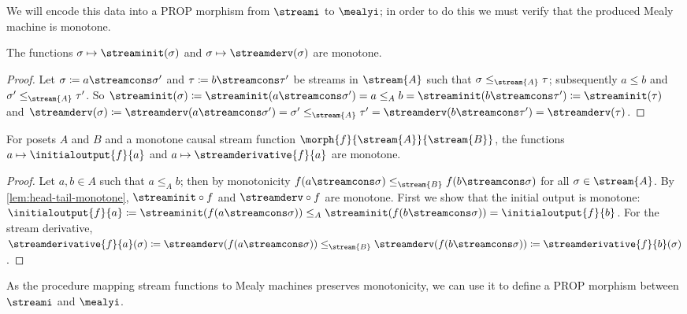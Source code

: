 \documentclass{lmcs}
\begin{document}
We will encode this data into a PROP morphism from \(\streami\) to \(\mealyi\);
in order to do this we must verify that the produced Mealy machine is monotone.

\begin{lem}\label{lem:head-tail-monotone}
    The functions \(\sigma \mapsto \streaminit(\sigma)\) and
    \(\sigma \mapsto \streamderv(\sigma)\) are monotone.
\end{lem}
\begin{proof}
    Let \(\sigma \coloneqq a \streamcons \sigma^\prime\) and
    \(\tau \coloneqq b \streamcons \tau^\prime\) be streams in \(\stream{A}\)
    such that \(\sigma \leq_{\stream{A}} \tau\); subsequently \(a \leq b\) and
    \(\sigma^\prime \leq_{\stream{A}} \tau^\prime\).
    So \(
    \streaminit(\sigma) \coloneqq
    \streaminit(a \streamcons \sigma^\prime) =
    a \leq_{A}
    b =
    \streaminit(b \streamcons \tau^\prime) \coloneqq
    \streaminit(\tau)
    \) and \(
    \streamderv(\sigma) \coloneqq
    \streamderv(a \streamcons \sigma^\prime) =
    \sigma^\prime \leq_{\stream{A}}
    \tau^\prime =
    \streamderv(b \streamcons \tau^\prime) =
    \streamderv(\tau)
    \).
\end{proof}

\begin{lem}\label{lem:initial-derivative-monotone}
    For posets \(A\) and \(B\) and a monotone causal stream function
    \(\morph{f}{\stream{A}}{\stream{B}}\), the functions
    \(a \mapsto \initialoutput{f}{a}\) and \(a \mapsto \streamderivative{f}{a}\)
    are monotone.
\end{lem}
\begin{proof}
    Let \(a, b \in A\) such that \(a \leq_A b\); then by monotonicity
    \(f(a \streamcons \sigma) \leq_{\stream{B}} f(b \streamcons \sigma)\) for
    all \(\sigma \in \stream{A}\).
    By \autoref{lem:head-tail-monotone}, \(\streaminit \circ f\) and
    \(\streamderv \circ f\) are monotone.
    First we show that the initial output is monotone: \(
    \initialoutput{f}{a} \coloneqq
    \streaminit(f(a \streamcons \sigma)) \leq_{A}
    \streaminit(f(b \streamcons \sigma)) =
    \initialoutput{f}{b}
    \).
    For the stream derivative, \(
    \streamderivative{f}{a}(\sigma) \coloneqq
    \streamderv(f(a \streamcons \sigma)) \leq_{\stream{B}}
    \streamderv(f(b \streamcons \sigma)) \coloneqq
    \streamderivative{f}{b}(\sigma)
    \).
\end{proof}

As the procedure mapping stream functions to Mealy machines preserves
monotonicity, we can use it to define a PROP morphism between \(\streami\) and
\(\mealyi\).
\end{document}
